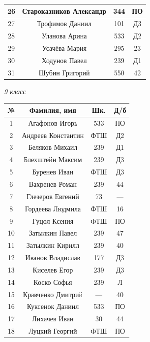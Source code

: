 \documentclass[11pt]{article}
\newlength{\h}
\newlength{\x}
\begin{document}
\begin{table}[ht]
\begin{minipage}[t]{0.45\linewidth}
\begin{tabular}[h]{|c|c|c|c|}
      26 & Староказников Александр & 344 & ПО \\ \hline
      27 & Трофимов Даниил & 101 & Д3 \\ \hline
      28 & Уланова Арина & 533 & Д2 \\ \hline
      29 & Усачёва Мария & 295 & 23 \\ \hline
      30 & Ходунов Павел & 239 & Д1 \\ \hline
      31 & Шубин Григорий & 550 & 42 \\ \hline
    \end{tabular}
  \end{minipage}
  \hfill
  \begin{minipage}[t]{0.45\linewidth}\centering
    \begin{center}
      \textit{9 класс}
    \end{center}
    \begin{tabular}[h]{|c|c|c|c|}
      \hline
      \textbf{№} & \textbf{Фамилия, имя} & \textbf{Шк.} & \textbf{Д/б}\\
      \hline
      1 & Агафонов Игорь & 533 & ПО  \\ \hline
      2 & Андреев Константин & ФТШ & Д2  \\ \hline
      3 & Беляков Михаил & 239 & Д1  \\ \hline
      4 & Блехштейн Максим & 239 & Д3  \\ \hline
      5 & Буренев Иван & ФТШ & Д3  \\ \hline
      6 & Вахренев Роман & 239 & 44  \\ \hline
      7 & Глезеров Евгений & 73 & ---  \\ \hline
      8 & Гордеева Людмила & ФТШ & 16  \\ \hline
      9 & Гуцол Ксения & ФТШ & ПО  \\ \hline
      10 & Затылкин Павел & 239 & 47  \\ \hline
      11 & Затылкин Кирилл & 239 & 40  \\ \hline
      12 & Иванов Владислав & 177 & Д3  \\ \hline
      13 & Киселев Егор & 239 & Д3  \\ \hline
      14 & Коско Софья & 239 & Л  \\ \hline
      15 & Кравченко Дмитрий & --- & 40  \\ \hline
      16 & Куксенок Даниил & 533 & ПО  \\ \hline
      17 & Лихачев Иван & 30 & 44  \\ \hline
      18 & Луцкий Георгий & ФТШ & ПО  \\ \hline

\end{tabular}
\end{minipage}
\end{table}
\end{document}
